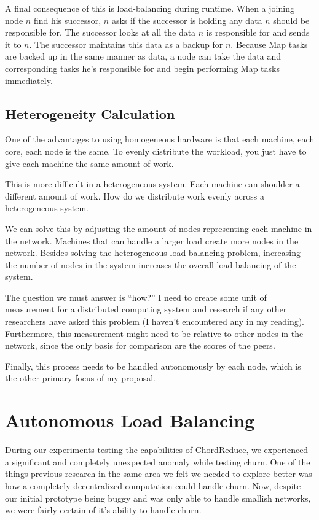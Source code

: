 A final consequence of this is load-balancing during runtime.  
When a joining node $n$ find his successor, $n$ asks if the successor is holding any data $n$ should be responsible for.  
The successor looks at all the data $n$ is responsible for and sends it to $n$.  
The successor maintains this data as a backup for $n$.  
Because Map tasks are backed up in the same manner as data, a node can take the data and corresponding tasks he's responsible for and begin performing Map tasks immediately.



\subsection{Heterogeneity Calculation}

One of the advantages to using homogeneous hardware is that each machine, each core, each node is the same.
To evenly distribute the workload, you just have to give each machine the same amount of work.

This is more difficult in a heterogeneous system.
Each machine can shoulder a different amount of work.
How do we distribute work evenly across a heterogeneous system.

We can solve this by adjusting the amount of nodes representing each machine in the network.
Machines that can handle a larger load create more nodes in the network.
Besides solving the heterogeneous load-balancing problem, increasing the number of nodes in the system increases the overall load-balancing of the system.


The question we must answer is ``how?''
I need to create some unit of measurement for a distributed computing system and research if any other researchers have asked this problem (I haven't encountered any in my reading).
Furthermore, this measurement might need to be relative to other nodes in the network, since the only basis for comparison are the scores of the peers.

Finally, this process needs to be handled autonomously by each node, which is the other primary focus of my proposal.
\section{Autonomous Load Balancing}
\label{sec:auto-load-bal}


During our experiments testing the capabilities of ChordReduce, we experienced a significant and completely unexpected anomaly while testing churn.
One of the things previous research \cite{marozzo2012p2p}  \cite{leemap} in the same area we felt we needed to explore better was how a completely decentralized computation could handle churn.
Now, despite our initial prototype being buggy and was only able to handle smallish networks, we were fairly certain of it's ability to handle churn.

